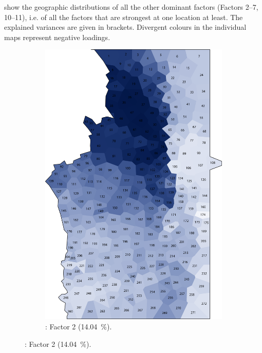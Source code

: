 \documentclass[output=paper]{LSP/langsci}
\begin{document}
show the geographic distributions of all the other dominant factors (Factors 2–7, 10–11), i.e. of all the factors that are strongest at one location at least. The explained variances are given in brackets. Divergent colours in the individual maps represent negative loadings. 

\begin{figure}
\centering
\begin{subfigure}[t]{0.3\textwidth}
\includegraphics[width=\textwidth]{illustrations/pickl_fig3}
\caption{: Factor 2 (14.04~\%).}
\label{fig:3}
\end{subfigure}   

\end{figure}
\end{document}
